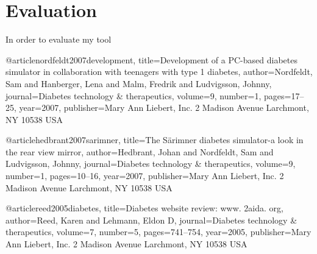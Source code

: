\chapter{Evaluation}
In order to evaluate my tool

\cite{pmid17316094} %


@article{nordfeldt2007development,
  title={Development of a PC-based diabetes simulator in collaboration with teenagers with type 1 diabetes},
  author={Nordfeldt, Sam and Hanberger, Lena and Malm, Fredrik and Ludvigsson, Johnny},
  journal={Diabetes technology \& therapeutics},
  volume={9},
  number={1},
  pages={17--25},
  year={2007},
  publisher={Mary Ann Liebert, Inc. 2 Madison Avenue Larchmont, NY 10538 USA}
}


@article{hedbrant2007sarimner,
  title={The S{\"a}rimner diabetes simulator-a look in the rear view mirror},
  author={Hedbrant, Johan and Nordfeldt, Sam and Ludvigsson, Johnny},
  journal={Diabetes technology \& therapeutics},
  volume={9},
  number={1},
  pages={10--16},
  year={2007},
  publisher={Mary Ann Liebert, Inc. 2 Madison Avenue Larchmont, NY 10538 USA}
}




@article{reed2005diabetes,
  title={Diabetes website review: www. 2aida. org},
  author={Reed, Karen and Lehmann, Eldon D},
  journal={Diabetes technology \& therapeutics},
  volume={7},
  number={5},
  pages={741--754},
  year={2005},
  publisher={Mary Ann Liebert, Inc. 2 Madison Avenue Larchmont, NY 10538 USA}
}